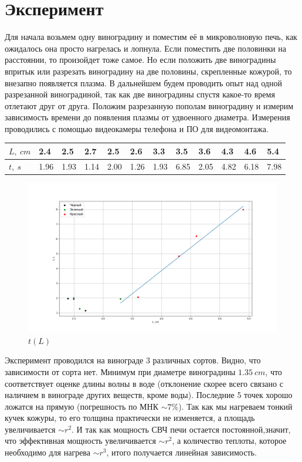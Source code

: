 \documentclass[a4paper,12pt]{article}
\begin{document}
	\section{Эксперимент}
	Для начала возьмем одну виноградину и поместим её в микроволновую печь, как ожидалось она просто нагрелась и лопнула. Если поместить две половинки на расстоянии, то произойдет тоже самое. Но если положить две виноградины впритык или разрезать виноградину на две половины, скрепленные кожурой, то внезапно появляется плазма. В дальнейшем будем проводить опыт над одной разрезанной виноградиной, так как две виноградины спустя какое-то время отлетают друг от друга.  Положим разрезанную пополам виноградину и измерим зависимость времени до появления плазмы от  удвоенного диаметра. Измерения проводились с помощью видеокамеры телефона и ПО для видеомонтажа.
	
	\begin{table}[!ht]
		\centering
		\begin{tabular}{|l|l|l|l|l|l|l|l|l|l|l|l|}
			\hline
			$L, \ cm$ & 2.4 & 2.5 & 2.7 & 2.5 & 2.6 & 3.3 & 3.5 & 3.6 & 4.3 & 4.6 & 5.4  \\ \hline
			$t, \ s$ & 1.96 & 1.93 & 1.14 & 2.00 & 1.26 & 1.93 & 6.85 & 2.05 & 4.82 & 6.18 & 7.98 \\ \hline
		\end{tabular}
	\end{table}
	\begin{figure}[h!]
		\centering
		\includegraphics[scale = 0.5]{vino}
		\caption{$t(L)$}
		\label{cylcat}
	\end{figure}
	Эксперимент проводился на винограде 3 различных сортов. Видно, что зависимости от сорта нет. Минимум при диаметре виноградины $1.35 \ cm$, что соответствует оценке длины волны в воде (отклонение скорее всего связано с наличием в винограде других веществ, кроме воды). Последние 5 точек хорошо ложатся на прямую (погрешность по МНК $ \sim 7 \%$). Так как мы нагреваем тонкий кучек кожуры, то его толщина практически не изменяется, а площадь увеличивается $\sim r^2$. И так как мощность СВЧ печи остается постоянной,значит, что эффективная мощность увеличивается $\sim r^2$, а количество теплоты, которое необходимо для нагрева $\sim r^3$,  итого получается линейная зависимость. 
	
\end{document}
